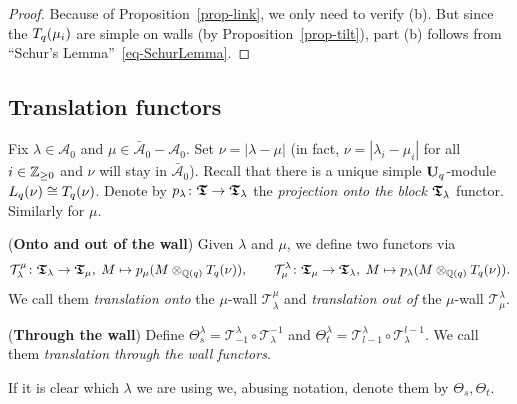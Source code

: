 \begin{proof}
Because of Proposition~\ref{prop-link}, we only 
need to verify (b). But since the $T_q({\mu_i})$ 
are simple on walls (by Proposition~\ref{prop-tilt}), 
part (b) follows from ``Schur's Lemma''~\eqref{eq-SchurLemma}.
\end{proof}



\subsection{Translation functors}\label{sub-translation}
Fix $\lambda\in\mathcal A_0$ and 
$\mu\in\bar{\mathcal{A}}_0-\mathcal A_0$. Set $\nu=|\lambda-\mu|$ 
(in fact, $\nu=|\lambda_i-\mu_i|$ for all 
$i\in\mathbb{Z}_{\geq 0}$ and $\nu$ will stay in $\bar{\mathcal{A}}_0$). 
Recall that there is a unique simple 
$\boldsymbol{\mathrm{U}}_q$-module $L_q({\nu})\cong T_q({\nu})$.
Denote by $p_{\lambda}\colon\boldsymbol{\mathfrak{T}}\to\boldsymbol{\mathfrak{T}}_{\lambda}$ the 
\textit{projection onto the block} $\boldsymbol{\mathfrak{T}}_{\lambda}$ functor. Similarly for $\mu$.



\begin{defn}(\textbf{Onto and out of the wall})\label{defn-onout}
Given $\lambda$ and $\mu$, we define 
two functors via
\[
\mathcal T_{\lambda}^{\mu}\colon\boldsymbol{\mathfrak{T}}_{\lambda}\to\boldsymbol{\mathfrak{T}}_{\mu},\;M\mapsto p_{\mu}(M\otimes_{\mathbb{Q}(q)}T_q({\nu})),\quad\quad\mathcal T^{\lambda}_{\mu}\colon\boldsymbol{\mathfrak{T}}_{\mu}\to\boldsymbol{\mathfrak{T}}_{\lambda},\;M\mapsto p_{\lambda}(M\otimes_{\mathbb{Q}(q)}T_q({\nu})).
\]
We call them \textit{translation onto} the $\mu$-wall $\mathcal T_{\lambda}^{\mu}$ and 
\textit{translation out of} the $\mu$-wall $\mathcal T^{\lambda}_{\mu}$.
\end{defn}




\begin{defn}(\textbf{Through the wall})\label{defn-trans}
Define $\Theta_s^{\lambda}=\mathcal T^{\lambda}_{-1}\circ \mathcal T_{\lambda}^{-1}$ and $\Theta_t^{\lambda}=\mathcal T^{\lambda}_{l-1}\circ \mathcal T_{\lambda}^{l-1}$. We 
call them \textit{translation through the wall functors}.
\end{defn}



If it is clear which $\lambda$ we are using we, abusing notation, denote them by $\Theta_s,\Theta_t$.



